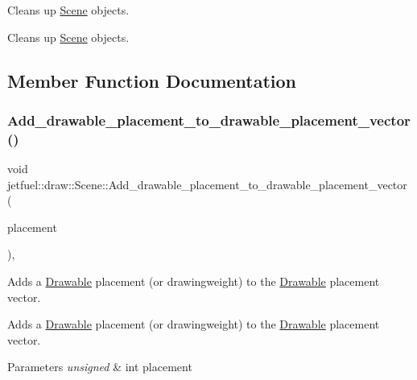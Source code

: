 Cleans up \hyperlink{classjetfuel_1_1draw_1_1Scene}{Scene} objects. 

Cleans up \hyperlink{classjetfuel_1_1draw_1_1Scene}{Scene} objects. 

\subsection{Member Function Documentation}
\mbox{\label{classjetfuel_1_1draw_1_1Scene_a4ab618141cf7e10c95cbe7b114688c1a}} 
\subsubsection{\texorpdfstring{Add\+\_\+drawable\+\_\+placement\+\_\+to\+\_\+drawable\+\_\+placement\+\_\+vector()}{Add\_drawable\_placement\_to\_drawable\_placement\_vector()}}
{\footnotesize\ttfamily void jetfuel\+::draw\+::\+Scene\+::\+Add\+\_\+drawable\+\_\+placement\+\_\+to\+\_\+drawable\+\_\+placement\+\_\+vector (\begin{DoxyParamCaption}\item[{const unsigned int}]{placement }\end{DoxyParamCaption})\hspace{0.3cm}{\ttfamily [inline]}, {\ttfamily [protected]}}



Adds a \hyperlink{classjetfuel_1_1draw_1_1Drawable}{Drawable} placement (or drawingweight) to the \hyperlink{classjetfuel_1_1draw_1_1Drawable}{Drawable} placement vector. 

Adds a \hyperlink{classjetfuel_1_1draw_1_1Drawable}{Drawable} placement (or drawingweight) to the \hyperlink{classjetfuel_1_1draw_1_1Drawable}{Drawable} placement vector.


\begin{DoxyParams}{Parameters}
{\em unsigned} & int placement \\
\hline
\end{DoxyParams}
\mbox{\label{classjetfuel_1_1draw_1_1Scene_a58984e589bd7ffa2940299fa88388765}} 
